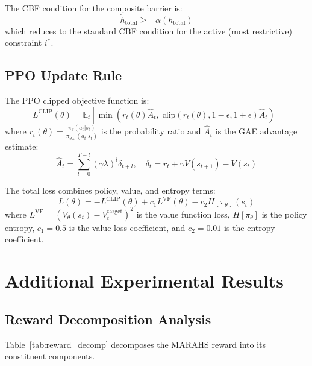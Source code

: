 \documentclass[12pt,a4paper]{article}
\DeclareRobustCommand{\E}{\mathbb{E}}
\begin{document}
The CBF condition for the composite barrier is:
\begin{equation}
    \dot{h}_{\text{total}} \geq -\alpha(h_{\text{total}})
\end{equation}
which reduces to the standard CBF condition for the active (most restrictive) constraint $i^*$.

\subsection{PPO Update Rule}

The PPO clipped objective function is:
\begin{equation}
    L^{\text{CLIP}}(\theta) = \E_t\left[\min\left(r_t(\theta)\hat{A}_t, \; \text{clip}(r_t(\theta), 1-\epsilon, 1+\epsilon)\hat{A}_t\right)\right]
\end{equation}
where $r_t(\theta) = \frac{\pi_\theta(a_t|s_t)}{\pi_{\theta_{\text{old}}}(a_t|s_t)}$ is the probability ratio and $\hat{A}_t$ is the GAE advantage estimate:
\begin{equation}
    \hat{A}_t = \sum_{l=0}^{T-t} (\gamma\lambda)^l \delta_{t+l}, \quad \delta_t = r_t + \gamma V(s_{t+1}) - V(s_t)
\end{equation}

The total loss combines policy, value, and entropy terms:
\begin{equation}
    L(\theta) = -L^{\text{CLIP}}(\theta) + c_1 L^{\text{VF}}(\theta) - c_2 H[\pi_\theta](s_t)
\end{equation}
where $L^{\text{VF}} = (V_\theta(s_t) - V_t^{\text{target}})^2$ is the value function loss, $H[\pi_\theta]$ is the policy entropy, $c_1 = 0.5$ is the value loss coefficient, and $c_2 = 0.01$ is the entropy coefficient.

\section{Additional Experimental Results}
\label{app:more_results}

\subsection{Reward Decomposition Analysis}

Table~\ref{tab:reward_decomp} decomposes the MARAHS reward into its constituent components.
\end{document}
